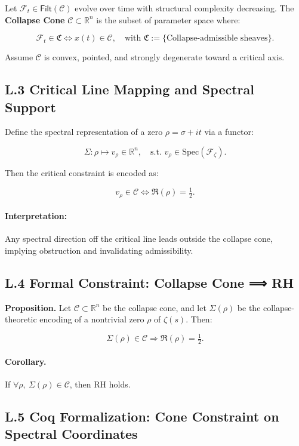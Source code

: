\documentclass[11pt]{article}
\begin{document}
Let \( \mathcal{F}_t \in \mathsf{Filt}(\mathcal{C}) \) evolve over time with structural complexity decreasing. The \textbf{Collapse Cone} \( \mathcal{C} \subset \mathbb{R}^n \) is the subset of parameter space where:

\[
\mathcal{F}_t \in \mathfrak{C} \iff x(t) \in \mathcal{C},\quad \text{with } \mathfrak{C} := \{\text{Collapse-admissible sheaves}\}.
\]

Assume \( \mathcal{C} \) is convex, pointed, and strongly degenerate toward a critical axis.

\subsection*{L.3 Critical Line Mapping and Spectral Support}

Define the spectral representation of a zero \( \rho = \sigma + it \) via a functor:

\[
\Sigma : \rho \mapsto v_\rho \in \mathbb{R}^n,\quad
\text{s.t. } v_\rho \in \mathrm{Spec}(\mathcal{F}_{\zeta}).
\]

Then the critical constraint is encoded as:

\[
v_\rho \in \mathcal{C} \iff \Re(\rho) = \tfrac{1}{2}.
\]

\paragraph{Interpretation:}  
Any spectral direction off the critical line leads outside the collapse cone, implying obstruction and invalidating admissibility.

\subsection*{L.4 Formal Constraint: Collapse Cone ⟹ RH}

\textbf{Proposition.}  
Let \( \mathcal{C} \subset \mathbb{R}^n \) be the collapse cone, and let \( \Sigma(\rho) \) be the collapse-theoretic encoding of a nontrivial zero \( \rho \) of \( \zeta(s) \). Then:

\[
\Sigma(\rho) \in \mathcal{C} \Rightarrow \Re(\rho) = \tfrac{1}{2}.
\]

\paragraph{Corollary.}  
If \( \forall \rho,\ \Sigma(\rho) \in \mathcal{C} \), then RH holds.

\subsection*{L.5 Coq Formalization: Cone Constraint on Spectral Coordinates}
\end{document}
